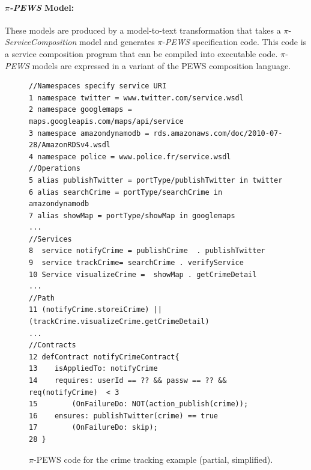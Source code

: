 \paragraph*{$\pi$\textit{-PEWS} Model:}
These models are produced by a model-to-text transformation that takes a $\pi$-\textit{ServiceComposition} model and generates $\pi$-\textit{PEWS} specification code.
This code is a service composition program that can be compiled into executable code.
$\pi$-\textit{PEWS} models are expressed in a variant of the PEWS composition language.

\begin{figure}[t]
\begin{footnotesize}
\begin{verbatim}
//Namespaces specify service URI
1 namespace twitter = www.twitter.com/service.wsdl
2 namespace googlemaps = maps.googleapis.com/maps/api/service
3 namespace amazondynamodb = rds.amazonaws.com/doc/2010-07-28/AmazonRDSv4.wsdl
4 namespace police = www.police.fr/service.wsdl
//Operations 
5 alias publishTwitter = portType/publishTwitter in twitter
6 alias searchCrime = portType/searchCrime in amazondynamodb 
7 alias showMap = portType/showMap in googlemaps 
...
//Services
8  service notifyCrime = publishCrime  . publishTwitter 
9  service trackCrime= searchCrime . verifyService
10 Service visualizeCrime =  showMap . getCrimeDetail
...
//Path
11 (notifyCrime.storeiCrime) || (trackCrime.visualizeCrime.getCrimeDetail)
...
//Contracts
12 defContract notifyCrimeContract{ 
13    isAppliedTo: notifyCrime
14	  requires: userId == ?? && passw == ?? && req(notifyCrime)  < 3
15 	      (OnFailureDo: NOT(action_publish(crime));
16	  ensures: publishTwitter(crime) == true
17 	      (OnFailureDo: skip);
28 }
\end{verbatim}
\end{footnotesize}
\caption{$\pi$-PEWS code for the crime tracking example (partial, simplified).\label{fig:pewscontract} }
\end{figure}

